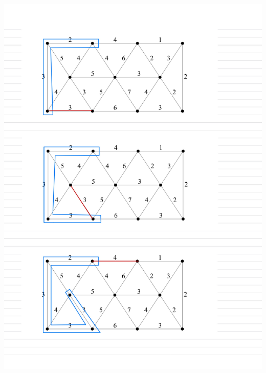 \documentclass[]{article}
\theoremstyle{definition}
\begin{document}
    \begin{center}
        \includegraphics[width=14cm]{HW1-5.jpg}
    \end{center}
\end{document}
